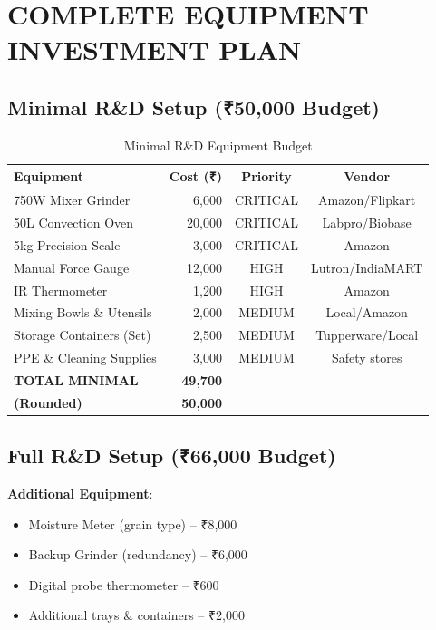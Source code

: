 \documentclass[12pt,a4paper]{article}
\begin{document}
\newpage

\section{COMPLETE EQUIPMENT INVESTMENT PLAN}

\subsection{Minimal R\&D Setup (₹50,000 Budget)}

\begin{table}[h]
\centering
\begin{tabular}{lrcc}
\toprule
\textbf{Equipment} & \textbf{Cost (₹)} & \textbf{Priority} & \textbf{Vendor} \\
\midrule
750W Mixer Grinder & 6,000 & CRITICAL & Amazon/Flipkart \\
50L Convection Oven & 20,000 & CRITICAL & Labpro/Biobase \\
5kg Precision Scale & 3,000 & CRITICAL & Amazon \\
Manual Force Gauge & 12,000 & HIGH & Lutron/IndiaMART \\
IR Thermometer & 1,200 & HIGH & Amazon \\
Mixing Bowls \& Utensils & 2,000 & MEDIUM & Local/Amazon \\
Storage Containers (Set) & 2,500 & MEDIUM & Tupperware/Local \\
PPE \& Cleaning Supplies & 3,000 & MEDIUM & Safety stores \\
\midrule
\textbf{TOTAL MINIMAL} & \textbf{49,700} & & \\
\textbf{(Rounded)} & \textbf{50,000} & & \\
\bottomrule
\end{tabular}
\caption{Minimal R\&D Equipment Budget}
\end{table}

\subsection{Full R\&D Setup (₹66,000 Budget)}

\textbf{Additional Equipment}:
\begin{itemize}
    \item Moisture Meter (grain type) -- ₹8,000
    \item Backup Grinder (redundancy) -- ₹6,000
    \item Digital probe thermometer -- ₹600
    \item Additional trays \& containers -- ₹2,000
\end{itemize}
\end{document}

